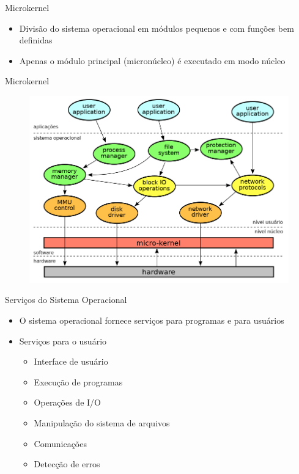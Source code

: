 \documentclass[aspectratio=169,
				xcolor=table]{beamer}
\begin{document}
	\begin{frame}{Microkernel}
	
	\begin{itemize}
		\item Divisão do sistema operacional em módulos pequenos e com funções bem definidas
		\vspace{1em}
		\item Apenas o módulo principal (micronúcleo) é executado em modo núcleo
	\end{itemize}	
	
	\end{frame}
	

	\begin{frame}{Microkernel}
			\begin{figure}[hbtp]
	\centering
	\includegraphics[height=.75\textheight, keepaspectratio]{../figs/cap01/microkernel}
	\end{figure}
	\end{frame}	
	
	\begin{frame}{Serviços do Sistema Operacional}
		\begin{itemize}
			\item O sistema operacional fornece serviços para programas e para usuários
			\item Serviços para o usuário
			\begin{itemize}
				\item Interface de usuário
				\item Execução de programas
				\item Operações de I/O
				\item Manipulação do sistema de arquivos
				\item Comunicações
				\item Detecção de erros
			\end{itemize}
		\end{itemize}
	\end{frame}
\end{document}

